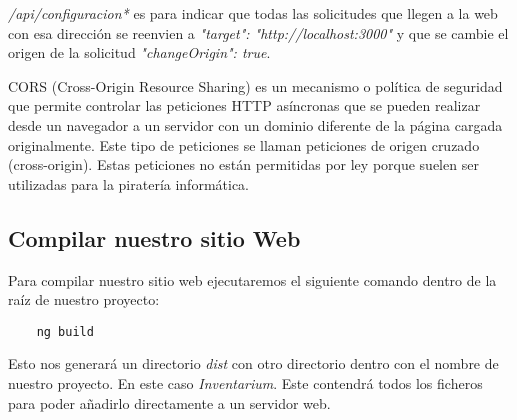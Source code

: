 \textit{/api/configuracion*} es para indicar que todas las solicitudes que llegen a la web con esa dirección se reenvien a \textit{"target": "http://localhost:3000"} y que se cambie el origen de la solicitud \textit{"changeOrigin": true}.
\begin{tcolorbox}
    [colback=green!5!white,colframe=green!75!black,fonttitle=\bfseries,title=¿Qué son las políticas de CORS?]
    CORS (Cross-Origin Resource Sharing) es un mecanismo o política de seguridad que permite controlar las peticiones HTTP asíncronas que se pueden realizar desde un navegador a un servidor con un dominio diferente de la página cargada originalmente. Este tipo de peticiones se llaman peticiones de origen cruzado (cross-origin). Estas peticiones no están permitidas por ley porque suelen ser utilizadas para la piratería informática.
\end{tcolorbox}

\subsection{Compilar nuestro sitio Web}
Para compilar nuestro sitio web ejecutaremos el siguiente comando dentro de la raíz de nuestro proyecto:
\begin{verbatim}
    ng build
\end{verbatim}
Esto nos generará un directorio \textit{dist} con otro directorio dentro con el nombre de nuestro proyecto. En este caso \textit{Inventarium}. Este contendrá todos los ficheros para poder añadirlo directamente a un servidor web.
